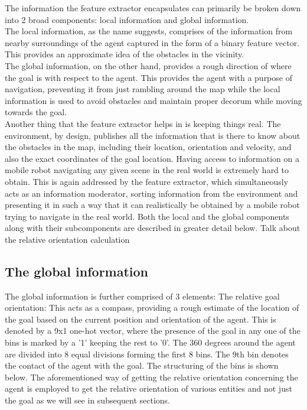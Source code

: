 The information the feature extractor encapsulates can primarily be broken down into 2 broad components: local information and global information.\\ The local information, as the name suggests, comprises of the information from nearby surroundings of the agent captured in the form of a binary feature vector. This provides an approximate idea of the obstacles in the vicinity.\\
 The global information, on the other hand, provides a rough direction of where the goal is with respect to the agent. This provides the agent with a purpose of navigation, preventing it from just rambling around the map while the local information is used to avoid obstacles and maintain proper decorum while moving towards the goal.\\
 Another thing that the feature extractor helps in is keeping things real. The environment, by design, publishes all the information that is there to know about the obstacles in the map, including their location, orientation and velocity, and also the exact coordinates of the goal location. Having access to  information on a mobile robot navigating any given scene in the real world is extremely hard to obtain.
This is again addressed by the feature extractor, which simultaneously acts as an information moderator, sorting information from the environment and presenting it in such a way that it can realistically be obtained by a mobile robot trying to navigate in the real world.
Both the local and the global components along with their subcomponents are described in greater detail below.
Talk about the relative orientation calculation


\subsection*{The global information}
The global information is further comprised of 3 elements:
The relative goal orientation: 
This acts as a compass, providing a rough estimate of the location of the goal based on the current position and orientation of the agent. This is denoted by a 9x1 one-hot vector, where the presence of the goal in any one of the bins is marked by a '1' keeping the rest to '0'. The 360 degrees around the agent are divided into 8 equal divisions forming the first 8 bins. The 9th bin denotes the contact of the agent with the goal. The structuring of the bins is shown below. 
The aforementioned way of getting the relative orientation concerning the agent is employed to get the relative orientation of various entities and not just the goal as we will see in subsequent sections.

